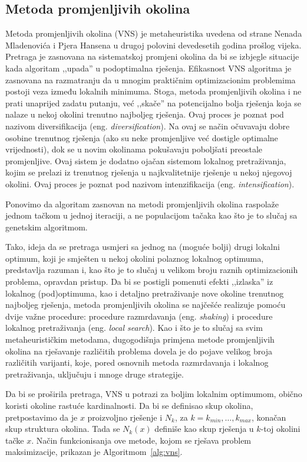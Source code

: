 \documentclass[a4paper, utf8, 11pt, colorlinks]{book}
\theoremstyle{definition}
\begin{document}
\subsection{Metoda promjenljivih okolina}\label{intro:vns}
Metoda promjenljivih okolina (VNS) je metaheuristika uvedena od strane Nenada Mladenovića i Pjera Hansena u drugoj polovini devedesetih godina prošlog vijeka.
Pretraga je zasnovana na sistematskoj promjeni okolina da bi se izbjegle situacije kada algoritam ,,upada'' u podoptimalna rješenja. Efikasnost VNS algoritma je zasnovana na razmatranju da u mnogim praktičnim optimizacionim problemima postoji veza između lokalnih minimuma. Stoga, metoda promjenljivih okolina i ne prati unaprijed zadatu putanju, već ,,skače'' na potencijalno bolja rješenja koja se nalaze u nekoj okolini trenutno najboljeg rješenja. Ovaj proces je poznat pod nazivom diversifikacija (eng. \emph{diversification}).
Na ovaj se način očuvavaju dobre osobine trenutnog rješenja (ako su neke promjenljive već dostigle optimalne vrijednosti), dok se u novim okolinama pokušavaju poboljšati preostale promjenljive. Ovaj sistem je dodatno ojačan sistemom lokalnog pretraživanja, kojim se prelazi iz trenutnog rješenja u najkvalitetnije rješenje u nekoj njegovoj okolini. Ovaj proces je poznat pod nazivom intenzifikacija (eng. \emph{intensification}).

Ponovimo da algoritam zasnovan na metodi promjenljivih okolina raspolaže jednom tačkom u jednoj iteraciji, a ne populacijom tačaka kao što je to slučaj sa genetskim algoritmom.

Tako, ideja da se pretraga usmjeri sa jednog na (moguće bolji) drugi lokalni optimum, koji je smješten u nekoj okolini polaznog lokalnog optimuma, predstavlja razuman  i, kao što je to slučaj u velikom broju raznih optimizacionih problema, opravdan pristup.
Da bi se postigli pomenuti efekti ,,izlaska'' iz lokalnog (pod)optimuma, kao i detaljno pretraživanje nove okoline trenutnog najboljeg rješenja, metoda promjenljivih okolina se najčešće realizuje pomoću dvije važne procedure: procedure razmrdavanja (eng. \emph{shaking}) i procedure lokalnog pretraživanja (eng. \emph{local search}). Kao i što je to slučaj sa svim metaheurističkim metodama, dugogodišnja primjena metode promjenljivih okolina na rješavanje različitih problema dovela je do pojave velikog broja različitih varijanti, koje, pored osnovnih metoda razmrdavanja i lokalnog pretraživanja, uključuju i mnoge druge strategije.

Da bi se proširila pretraga,  VNS u potrazi za boljim lokalnim optimumom, obično koristi okoline rastuće kardinalnosti. Da bi se definisao skup okolina, pretpostavimo da je $x$ proizvoljno rješenje i $N_k$, za $k=k_{min},\ldots,k_{max}$, konačan skup struktura okolina. Tada se  $N_k(x)$ definiše kao skup rješenja u $k$-toj okolini tačke $x$. 
Način funkcionisanja ove metode, kojom se rješava problem maksimizacije, prikazan je Algoritmom~\ref{alg:vns}. 
\end{document}
